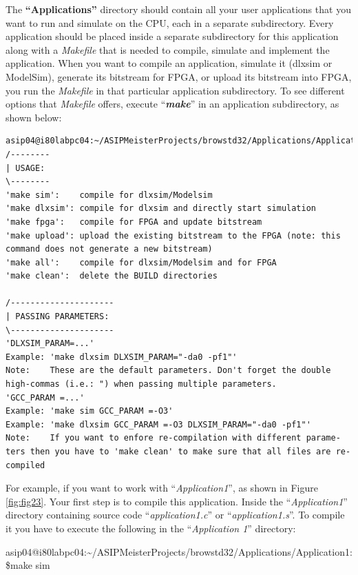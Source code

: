 The \textbf{``Applications''} directory should contain all your user
applications that you want to run and simulate on the CPU, each in a
separate subdirectory. Every application should be placed inside a
separate subdirectory for this application along with a \emph{Makefile}
that is needed to compile, simulate and implement the application. When
you want to compile an application, simulate it (dlxsim or ModelSim),
generate its bitstream for FPGA, or upload its bitstream into FPGA, you
run the \emph{Makefile} in that particular application subdirectory. To
see different options that \emph{Makefile} offers, execute
``\emph{\textbf{make}}'' in an application subdirectory, as shown below:
\begin{lstlisting}
asip04@i80labpc04:~/ASIPMeisterProjects/browstd32/Applications/Application1:$make
/--------
| USAGE:
\--------
'make sim':    compile for dlxsim/Modelsim
'make dlxsim': compile for dlxsim and directly start simulation
'make fpga':   compile for FPGA and update bitstream
'make upload': upload the existing bitstream to the FPGA (note: this command does not generate a new bitstream)
'make all':    compile for dlxsim/Modelsim and for FPGA
'make clean':  delete the BUILD directories

/---------------------
| PASSING PARAMETERS:
\---------------------
'DLXSIM_PARAM=...'
Example: 'make dlxsim DLXSIM_PARAM="-da0 -pf1"'
Note:    These are the default parameters. Don't forget the double high-commas (i.e.: ") when passing multiple parameters.
'GCC_PARAM =...'
Example: 'make sim GCC_PARAM =-O3'
Example: 'make dlxsim GCC_PARAM =-O3 DLXSIM_PARAM="-da0 -pf1"'
Note:    If you want to enfore re-compilation with different parame-ters then you have to 'make clean' to make sure that all files are re-compiled
\end{lstlisting}
For example, if you want to work with ``\emph{Application1}'', as shown
in Figure \ref{fig:fig23}. Your first step is to compile
this application. Inside the ``\emph{Application1}'' directory
containing source code ``\emph{application1.c}'' or
``\emph{application1.s}''. To compile it you have to execute the
following in the ``\emph{Application 1}'' directory:

asip04@i80labpc04:\textasciitilde/ASIPMeisterProjects/browstd32/Applications/Application1:\$make
sim

